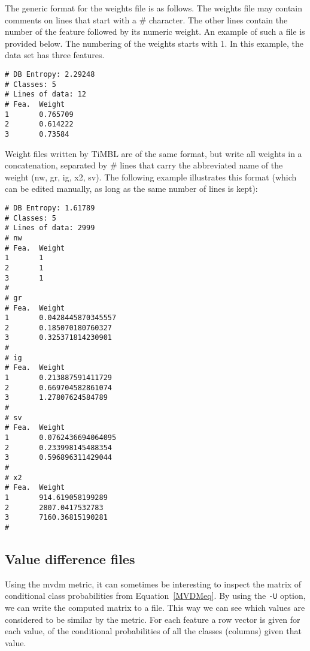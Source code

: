 \documentclass{report}
\begin{document}
The generic format for the weights file is as follows.  The weights
file may contain comments on lines that start with a \# character. The
other lines contain the number of the feature followed by its numeric
weight. An example of such a file is provided below. The numbering of
the weights starts with 1. In this example, the data set has three features.

\begin{footnotesize}
\begin{verbatim}
# DB Entropy: 2.29248
# Classes: 5
# Lines of data: 12
# Fea.  Weight
1       0.765709
2       0.614222
3       0.73584
\end{verbatim}
\end{footnotesize}

Weight files written by TiMBL are of the same format, but write all
weights in a concatenation, separated by \# lines that carry the
abbreviated name of the weight (nw, gr, ig, x2, sv). The following
example illustrates this format (which can be edited manually, as long
as the same number of lines is kept):

\begin{footnotesize}
\begin{verbatim}
# DB Entropy: 1.61789
# Classes: 5
# Lines of data: 2999
# nw
# Fea.  Weight
1       1
2       1
3       1
#
# gr
# Fea.  Weight
1       0.0428445870345557
2       0.185070180760327
3       0.325371814230901
#
# ig
# Fea.  Weight
1       0.213887591411729
2       0.669704582861074
3       1.27807624584789
#
# sv
# Fea.  Weight
1       0.0762436694064095
2       0.233998145488354
3       0.596896311429044
#
# x2
# Fea.  Weight
1       914.619058199289
2       2807.0417532783
3       7160.36815190281
#

\end{verbatim}
\end{footnotesize}


\subsection{Value difference files}
\label{mvdmformat}

Using the {\sc mvdm} metric, it can sometimes be interesting to
inspect the matrix of conditional class probabilities from
Equation~\ref{MVDMeq}. By using the {\tt -U} option, we can write the
computed matrix to a file. This way we can see which values are
considered to be similar by the metric. For each feature a row vector
is given for each value, of the conditional probabilities of all the
classes (columns) given that value.
\end{document}
